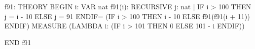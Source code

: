 f91: THEORY
  BEGIN
  i: VAR nat
  f91(i):
    RECURSIVE \setb{}j: nat | IF i > 100 THEN j = i - 10 ELSE j = 91 ENDIF\sete =
      (IF i > 100 THEN i - 10 ELSE f91(f91(i + 11)) ENDIF)
    MEASURE (LAMBDA i: (IF i > 101 THEN 0 ELSE 101 - i ENDIF))
     
  END f91
